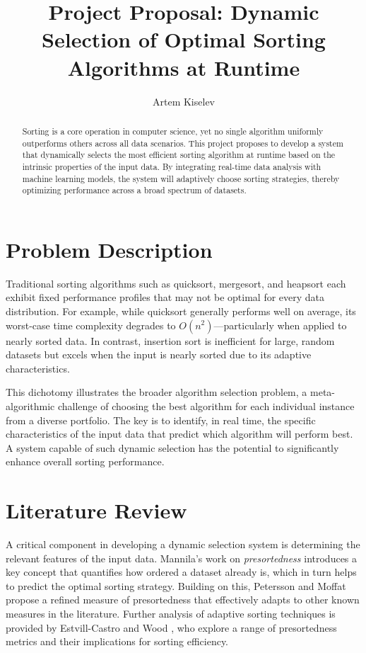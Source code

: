\documentclass{article}
\title{Project Proposal: Dynamic Selection of Optimal Sorting Algorithms at Runtime}
\author{Artem Kiselev}
\begin{document}
\maketitle

\begin{abstract}
\noindent Sorting is a core operation in computer science, yet no single algorithm uniformly outperforms others across all data scenarios. This project proposes to develop a system that dynamically selects the most efficient sorting algorithm at runtime based on the intrinsic properties of the input data. By integrating real-time data analysis with machine learning models, the system will adaptively choose sorting strategies, thereby optimizing performance across a broad spectrum of datasets.
\end{abstract}

\section{Problem Description}
Traditional sorting algorithms such as quicksort, mergesort, and heapsort each exhibit fixed performance profiles that may not be optimal for every data distribution. For example, while quicksort generally performs well on average, its worst-case time complexity degrades to $O(n^2)$—particularly when applied to nearly sorted data. In contrast, insertion sort is inefficient for large, random datasets but excels when the input is nearly sorted due to its adaptive characteristics.

This dichotomy illustrates the broader algorithm selection problem, a meta-algorithmic challenge of choosing the best algorithm for each individual instance from a diverse portfolio. The key is to identify, in real time, the specific characteristics of the input data that predict which algorithm will perform best. A system capable of such dynamic selection has the potential to significantly enhance overall sorting performance.

\section{Literature Review}
A critical component in developing a dynamic selection system is determining the relevant features of the input data. Mannila's work on \textit{presortedness} \cite{Mannila1985MeasuresOP} introduces a key concept that quantifies how ordered a dataset already is, which in turn helps to predict the optimal sorting strategy. Building on this, Petersson and Moffat \cite{PETERSSON1995153} propose a refined measure of presortedness that effectively adapts to other known measures in the literature. Further analysis of adaptive sorting techniques is provided by Estvill-Castro and Wood \cite{adaptivesortingsurvey}, who explore a range of presortedness metrics and their implications for sorting efficiency.
\end{document}
